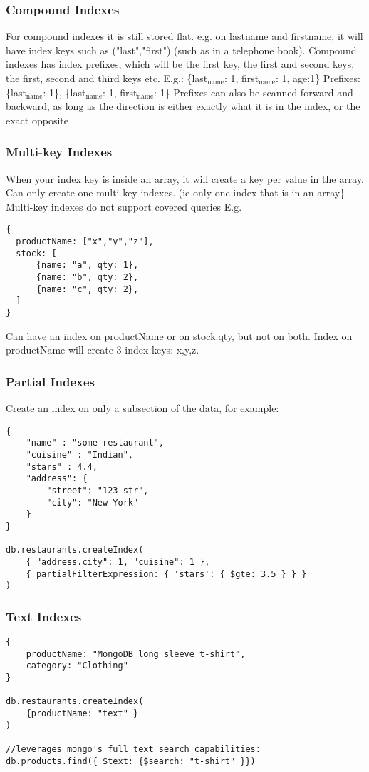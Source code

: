 \documentclass[11pt]{article}
\begin{document}
\subsubsection{Compound Indexes}
\label{sec:org44729e3}
For compound indexes it is still stored flat. e.g. on lastname and firstname, it will have index keys such as ("last","first") (such as in a telephone book).
Compound indexes has index prefixes, which will be the first key, the first and second keys, the first, second and third keys etc.
E.g.: \{last\(_{\text{name}}\): 1, first\(_{\text{name}}\): 1, age:1\}
Prefixes: \{last\(_{\text{name}}\): 1\}, \{last\(_{\text{name}}\): 1, first\(_{\text{name}}\): 1\}
Prefixes can also be scanned forward and backward, as long as the direction is either exactly what it is in the index, or the exact opposite

\subsubsection{Multi-key Indexes}
\label{sec:org5df66ae}
When your index key is inside an array, it will create a key per value in the array. Can only create one multi-key indexes. (ie only one index that is in an array\}
Multi-key indexes do not support covered queries
E.g.
\begin{verbatim}
{
  productName: ["x","y","z"],
  stock: [
      {name: "a", qty: 1},
      {name: "b", qty: 2},
      {name: "c", qty: 2},
  ]
}
\end{verbatim}
Can have an index on productName or on stock.qty, but not on both. Index on productName will create 3 index keys: x,y,z. 

\subsubsection{Partial Indexes}
\label{sec:org5d43042}
Create an index on only a subsection of the data, for example:
\begin{verbatim}
{
    "name" : "some restaurant",
    "cuisine" : "Indian",
    "stars" : 4.4,
    "address": {
        "street": "123 str",
        "city": "New York"
    }
}

db.restaurants.createIndex(
    { "address.city": 1, "cuisine": 1 },
    { partialFilterExpression: { 'stars': { $gte: 3.5 } } }
)
\end{verbatim}

\subsubsection{Text Indexes}
\label{sec:org5457ce7}
\begin{verbatim}
{
    productName: "MongoDB long sleeve t-shirt",
    category: "Clothing"
}

db.restaurants.createIndex(
    {productName: "text" }
)

//leverages mongo's full text search capabilities:
db.products.find({ $text: {$search: "t-shirt" }})
\end{verbatim}
\end{document}
